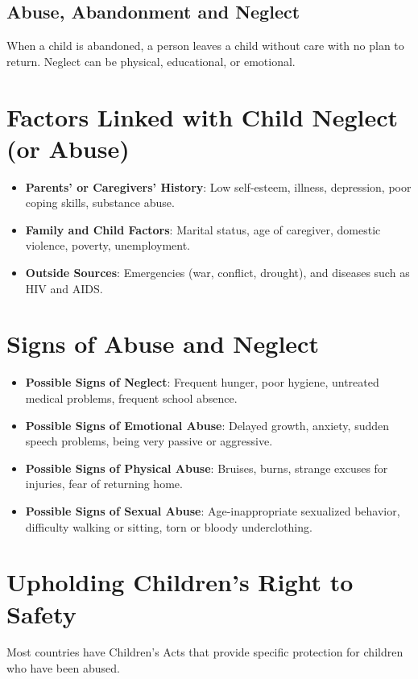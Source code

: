 \documentclass[12pt,a4paper]{article}
\begin{document}
\subsection*{Abuse, Abandonment and Neglect}
When a child is abandoned, a person leaves a child without care with no plan to return. Neglect can be physical, educational, or emotional.

\section*{Factors Linked with Child Neglect (or Abuse)}
\begin{itemize}
    \item \textbf{Parents' or Caregivers' History}: Low self-esteem, illness, depression, poor coping skills, substance abuse.
    \item \textbf{Family and Child Factors}: Marital status, age of caregiver, domestic violence, poverty, unemployment.
    \item \textbf{Outside Sources}: Emergencies (war, conflict, drought), and diseases such as HIV and AIDS.
\end{itemize}

\section*{Signs of Abuse and Neglect}
\begin{itemize}
    \item \textbf{Possible Signs of Neglect}: Frequent hunger, poor hygiene, untreated medical problems, frequent school absence.
    \item \textbf{Possible Signs of Emotional Abuse}: Delayed growth, anxiety, sudden speech problems, being very passive or aggressive.
    \item \textbf{Possible Signs of Physical Abuse}: Bruises, burns, strange excuses for injuries, fear of returning home.
    \item \textbf{Possible Signs of Sexual Abuse}: Age-inappropriate sexualized behavior, difficulty walking or sitting, torn or bloody underclothing.
\end{itemize}

\section*{Upholding Children’s Right to Safety}
Most countries have Children's Acts that provide specific protection for children who have been abused.
\end{document}
